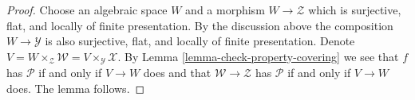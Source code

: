 \documentclass[10pt,a4paper]{amsart}
\theoremstyle{plain}
\theoremstyle{definition}
\theoremstyle{remark}
\numberwithin{equation}{subsection}
\begin{document}
\begin{proof}
Choose an algebraic space $W$ and a morphism
$W \to \mathcal{Z}$ which is surjective, flat, and locally of finite
presentation. By the discussion above the composition
$W \to \mathcal{Y}$ is also surjective, flat, and locally of finite
presentation. Denote
$V = W \times_\mathcal{Z} \mathcal{W} = V \times_\mathcal{Y} \mathcal{X}$.
By
Lemma \ref{lemma-check-property-covering}
we see that $f$ has $\mathcal{P}$ if and only if $V \to W$ does
and that $\mathcal{W} \to \mathcal{Z}$ has $\mathcal{P}$ if and only
if $V \to W$ does. The lemma follows.
\end{proof}
\end{document}
